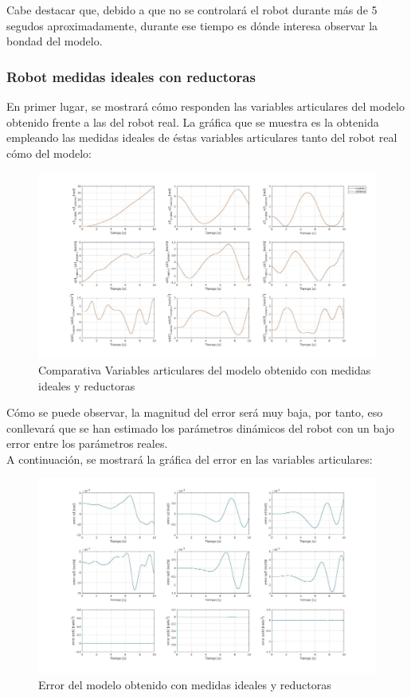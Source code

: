Cabe destacar que, debido a que no se controlará el robot durante más de 5 segudos aproximadamente, durante ese tiempo es dónde interesa observar la bondad del modelo.
\subsubsection{Robot medidas ideales con reductoras}
En primer lugar, se mostrará cómo responden las variables articulares del modelo obtenido frente a las del robot real. La gráfica que se muestra es la obtenida empleando las medidas ideales de éstas variables articulares tanto del robot real cómo del modelo:

\begin{figure}[h!]
	\centering
	\includegraphics[width=1\textwidth]{EstimacParam_SisMod_In1_IdealCR}
	\caption{Comparativa Variables articulares del modelo obtenido con medidas ideales y reductoras}
\end{figure}

Cómo se puede observar, la magnitud del error será muy baja, por tanto, eso conllevará que se han estimado los parámetros dinámicos del robot con un bajo error entre los parámetros reales.\\
\newpage
A continuación, se mostrará la gráfica del error en las variables articulares:

\begin{figure}[h!]
	\centering
	\includegraphics[width=1\textwidth]{EstimacParam_SisModError_In1_IdealCR}
	\caption{Error del modelo obtenido con medidas ideales y reductoras}
\end{figure}

